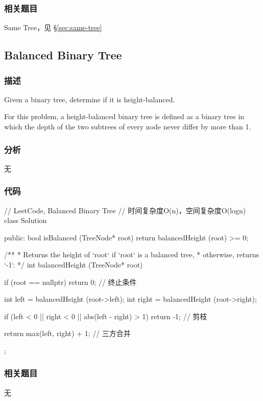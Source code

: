 \subsubsection{相关题目}
\begindot
\item Same Tree，见 \S \ref{sec:same-tree}
\myenddot


\subsection{Balanced Binary Tree}
\label{sec:balanced-binary-tree}


\subsubsection{描述}
Given a binary tree, determine if it is height-balanced.

For this problem, a height-balanced binary tree is defined as a binary tree in which the depth of the two subtrees of every node never differ by more than 1.


\subsubsection{分析}
无


\subsubsection{代码}
\begin{Code}
// LeetCode, Balanced Binary Tree
// 时间复杂度O(n)，空间复杂度O(logn)
class Solution {
public:
    bool isBalanced (TreeNode* root) {
        return balancedHeight (root) >= 0;
    }

    /**
     * Returns the height of `root` if `root` is a balanced tree,
     * otherwise, returns `-1`.
     */
    int balancedHeight (TreeNode* root) {
        if (root == nullptr) return 0;  // 终止条件

        int left = balancedHeight (root->left);
        int right = balancedHeight (root->right);

        if (left < 0 || right < 0 || abs(left - right) > 1) return -1;  // 剪枝

        return max(left, right) + 1; // 三方合并
    }
};
\end{Code}


\subsubsection{相关题目}
\begindot
\item 无
\myenddot


